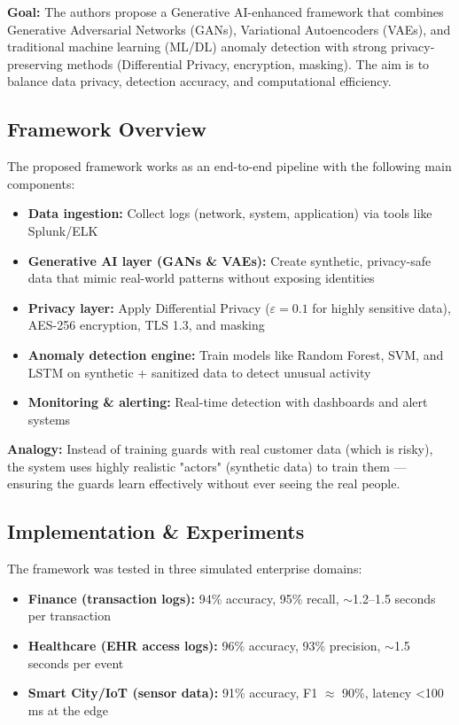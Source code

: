\textbf{Goal:} The authors propose a Generative AI-enhanced framework that combines Generative Adversarial Networks (GANs), Variational Autoencoders (VAEs), and traditional machine learning (ML/DL) anomaly detection with strong privacy-preserving methods (Differential Privacy, encryption, masking). The aim is to balance data privacy, detection accuracy, and computational efficiency.

\subsection{Framework Overview}

The proposed framework works as an end-to-end pipeline with the following main components:

\begin{itemize}
    \item \textbf{Data ingestion:} Collect logs (network, system, application) via tools like Splunk/ELK
    \item \textbf{Generative AI layer (GANs \& VAEs):} Create synthetic, privacy-safe data that mimic real-world patterns without exposing identities
    \item \textbf{Privacy layer:} Apply Differential Privacy ($\varepsilon=0.1$ for highly sensitive data), AES-256 encryption, TLS 1.3, and masking
    \item \textbf{Anomaly detection engine:} Train models like Random Forest, SVM, and LSTM on synthetic + sanitized data to detect unusual activity
    \item \textbf{Monitoring \& alerting:} Real-time detection with dashboards and alert systems
\end{itemize}

\textbf{Analogy:} Instead of training guards with real customer data (which is risky), the system uses highly realistic "actors" (synthetic data) to train them — ensuring the guards learn effectively without ever seeing the real people.

\subsection{Implementation \& Experiments}

The framework was tested in three simulated enterprise domains:

\begin{itemize}
    \item \textbf{Finance (transaction logs):} 94\% accuracy, 95\% recall, $\sim$1.2–1.5 seconds per transaction
    \item \textbf{Healthcare (EHR access logs):} 96\% accuracy, 93\% precision, $\sim$1.5 seconds per event
    \item \textbf{Smart City/IoT (sensor data):} 91\% accuracy, F1 $\approx$ 90\%, latency <100 ms at the edge
\end{itemize}

